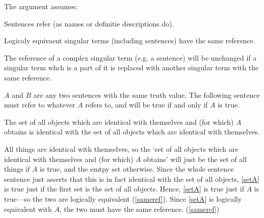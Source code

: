 The argument assumes:

	\begin{thesis} \label{srefer}
	Sentences refer (as names or definitie descriptions do).
	\end{thesis}


	\begin{thesis} \label{sameref}
	Logicaly equivaent singular terms (including sentences) have the same reference.
	\end{thesis}

	
	\begin{thesis} \label{constref}
	The reference of a complex singular term (e.g. a sentence) will be unchanged if a singular term whch is a part of it is replaced with another singular term with the same reference.
	\end{thesis}
	

$A$ and $B$ are any two sentences with the same truth value. 
The following sentence must refer to whatever $A$ refers to, and will be true if and only if $A$ is true.

	\begin{example} \label{setA}
	The set of all objects which are identical with themselves and (for which) $A$ obtains is identical with the set of all objects which are identical with themselves.
	\end{example}

All things are identical with themselves, so the `set of all objects which are identical with themselves and (for which) $A$ obtains' will just be the set of all things if $A$ is true, and the emtpy set otherwise.
Since the whole sentence sentence just asserts that this is in fact identical with the set of all objects, \ref{setA} is true just if the first set is the set of all objects.
Hence, \ref{setA} is true just if $A$ is true---so the two are logically equivalent (\ref{sameref}).
Since \ref{setA} is logically equivalent with $A$, the two must have the same reference. 
(\ref{sameref})

